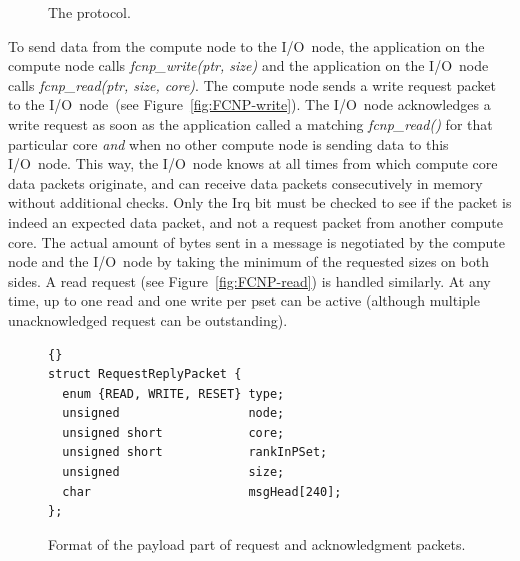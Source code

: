 \documentclass[journal]{IEEEtran}
\begin{document}
\begin{figure}[h]
\hfill
{}
\caption{The protocol.}
\label{fig:FCNP-protocol}
\end{figure}

To send data from the compute node to the I/O~node, the application on the
compute node calls \emph{fcnp\_write(ptr, size)\/} and the application on the
I/O~node calls \emph{fcnp\_read(ptr, size, core)}.
The compute node sends a write request packet to the I/O~node~(see
Figure~\ref{fig:FCNP-write}).
The I/O~node acknowledges a write request as soon as the application called a
matching \emph{fcnp\_read()} for that particular core \emph{and\/} when no
other compute node is sending data to this I/O~node.
This way, the I/O~node knows at all times from which compute core data packets
originate, and can receive data packets consecutively in memory without
additional checks.
Only the Irq bit must be checked to see if the packet is indeed an expected
data packet, and not a request packet from another compute core.
The actual amount of bytes sent in a message is negotiated by the compute node
and the I/O~node by taking the minimum of the requested sizes on both sides.
A read request (see Figure~\ref{fig:FCNP-read}) is handled similarly.
At any time, up to one read and one write per pset can be active (although
multiple unacknowledged request can be outstanding).

\begin{figure}[h]
\begin{lstlisting}{}
struct RequestReplyPacket {
  enum {READ, WRITE, RESET} type;
  unsigned                  node;
  unsigned short            core;
  unsigned short            rankInPSet;
  unsigned                  size;
  char                      msgHead[240];
};
\end{lstlisting}
\caption{Format of the payload part of request and acknowledgment packets.}
\label{fig:control-packet-format}
\end{figure}
\end{document}
